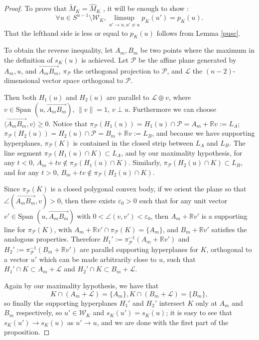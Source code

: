 \documentclass[a4paper,12pt]{amsart}
\def\R{\mathbb R}
\def\eps{\varepsilon}
\begin{document}
\begin{proof}
To prove that $ \tilde M_K=\hat M_K$ ,
it will be enough to show :
\[
 \forall u\in S^{n-1}\setminus \mathcal W_K,
\limsup_{u'\to u, u'\neq u} p_K(u')= p_K(u).
\]
That the lefthand side is less or equal to $p_K(u)$
follows from Lemma \ref{pusc}.

To obtain the reverse inequality, let $A_m, B_m$ be two points
where the maximum in the definition of $s_K(u)$ is achieved. Let
$\mathcal P$ be the affine plane generated by $A_m, u$, and
$\overrightarrow{A_m B_m} $, $\pi_{\mathcal P}$ the orthogonal
projection to $\mathcal P$, and $\mathcal L$ the
$(n-2)$-dimensional vector space orthogonal to $\mathcal P$.

Then both $H_1(u)$ and $H_2(u)$ are parallel to $\mathcal L \oplus
v$, where $v \in \mbox{Span }(u,\overrightarrow{A_m B_m} )$,
$\|v\|=1$, $v\perp u$. Furthermore we can choose $ \langle
\overrightarrow{A_m B_m}, v \rangle \ge 0$. Notice that
$\pi_{\mathcal P}(H_1(u)) = H_1(u)\cap \mathcal P=A_m+\R v :=L_A$;
$\pi_{\mathcal P}(H_2(u)) = H_2(u)\cap \mathcal P=B_m+\R v :=L_B$,
and because we have supporting hyperplanes, $\pi_{\mathcal P}(K)$
is contained in the closed strip between $L_A$ and $L_B$. The line
segment $\pi_{\mathcal P}(H_1(u)\cap K)\subset L_A$, and by our
maximality hypothesis, for any $t<0$, $A_m+tv \notin \pi_{\mathcal
P}(H_1(u)\cap K)$. Similarly, $\pi_{\mathcal P}(H_2(u)\cap
K)\subset L_B$, and
 for any $t>0$,
$B_m+tv \notin \pi_{\mathcal P}(H_2(u)\cap K)$.

Since $\pi_{\mathcal P}(K)$ is a closed polygonal convex body,
if we orient the plane so that $\angle (\overrightarrow{A_m B_m}, v) >0$,
then there exists $\eps_0>0$ such that for any unit vector $v' \in \mbox{Span }
(u,\overrightarrow{A_m B_m} )$ with $0< \angle (v,v') < \eps_0$,
then $A_m+\R v'$ is a supporting line for $\pi_{\mathcal P}(K)$,
with $A_m+\R v' \cap \pi_{\mathcal P}(K) = \{ A_m\}$,
and  $B_m+\R v'$ satisfies the analogous properties.
Therefore $H_1':=\pi_{\mathcal P}^{-1} (A_m+\R v')$
and $H_2':=\pi_{\mathcal P}^{-1} (B_m+\R v')$ are
parallel supporting hyperplanes for $K$, orthogonal to a vector $u'$
which can be made arbitrarily close to $u$, such that
$H_1' \cap K \subset A_m + \mathcal L$ and
$H_2' \cap K \subset B_m + \mathcal L$.

Again by our maximality hypothesis, we have that
\[
K \cap (A_m + \mathcal L)
= \{ A_m\} , K \cap (B_m + \mathcal L)= \{ B_m\},
\]
so finally the supporting hyperplanes $H_1'$ and $H_2'$ intersect
$K$ only at $A_m$ and $B_m$ respectively, so $u'\in \mathcal W_K$
and $s_K(u')=s_K(u)$; it is easy to see that $s_K(u')\to s_K(u)$
as $u'\to u$, and we are done with the first part of the
proposition.


\end{proof}
\end{document}
